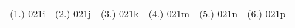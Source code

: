 {\begin{center}
\end{center}


\par \practiceinfo
\par \begin{tabular}[h]{cccccc}
(1.) 021i &
(2.) 021j &
(3.) 021k &
(4.) 021m &
(5.) 021n &
(6.) 021p \\
\end{tabular}}
\pagebreak
